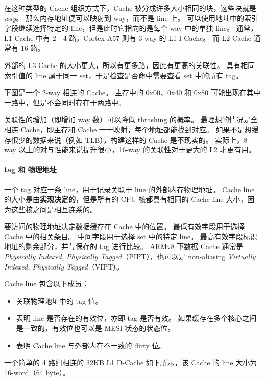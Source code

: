 在这种类型的 Cache 组织方式下，Cache 被分成许多大小相同的块，这些块就是 \textit{way}。
那么内存地址便可以映射到 way，而不是 line 上。
可以使用地址中的索引字段继续选择特定的 line，但是此时它指向的是每个 way 中的单独 line。
通常，L1 Cache 中有 2 - 4 路，Cortex-A57 则有 3-way 的 L1 I-Cache。
而 L2 Cache 通常有 16 路。

外部的 L3 Cache 的大小更大，所以有更多路，因此有更高的关联性。
具有相同索引值的 line 属于同一 set，于是检查是否命中需要查看 set 中的所有 tag。

下图是一个 2-way 相连的 Cache。
主存中的 0x00、0x40 和 0x80 可能出现在其中一路中，但是不会同时存在于两路中。


关联性的增加（即增加 way 数）可以降低 thrashing 的概率。
最理想的情况是全相连 Cache，即主存和 Cache 一一映射，每个地址都能找到对应。
如果不是想缓存很少的数据来说（例如 TLB），构建这样的 Cache 是不现实的。
实际上，8-way 以上的对与性能来说提升很小，16-way 的关联性对于更大的 L2 才更有用。

\paragraph*{tag 和 物理地址}

一个 tag 对应一条 line，用于记录关联于 line 的外部内存物理地址。
Cache line 的大小是由\textbf{实现决定的}，但是所有的 CPU 核都具有相同的 Cache line 大小，因为这些核之间是相互连系的。

要访问的物理地址决定数据缓存在 Cache 中的位置。
最低有效字段用于选择 Cache 中的相关条目。
中间字段用于选择 set 中的特定 line。
最高有效字段标识地址的剩余部分，并与保存的 tag 进行比较。
ARMv8 下数据 Cache 通常是 \textit{Physically Indexed, Physically Tagged}（PIPT），也可以是 non-aliasing \textit{Virtually Indexed, Physically Tagged}（VIPT）。

Cache line 包含以下成员：

\begin{itemize}
  \item 关联物理地址中的 tag 值。
  \item 表明 line 是否存在的有效位，亦即 tag 是否有效。
    如果缓存在多个核心之间是一致的，有效位也可以是 MESI 状态的状态位。
  \item 表明 Cache line 与外部内存不一致的 dirty 位。
\end{itemize}

一个简单的 4 路组相连的 32KB L1 D-Cache 如下所示，该 Cache 的 line 大小为 16-word（64 byte）。

